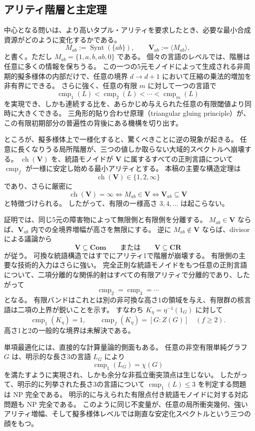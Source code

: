 \documentclass[10pt,a4paper]{ltjsarticle}
\theoremstyle{definition}
\theoremstyle{remark}
\newcommand{\cmp}{\operatorname{cmp}}
\begin{document}
\subsection{アリティ階層と主定理}

中心となる問いは、より高いタプル・アリティを要求したとき、必要な最小合成資源がどのように変化するかである。
\[
M_{ab}:=\operatorname{Synt}(\{ab\}),
\qquad
\mathbf V_{ab}:=\langle M_{ab}\rangle,
\]
と書く。ただし $M_{ab}=\{1,a,b,ab,0\}$ である。
個々の言語のレベルでは、階層は任意に多くの情報を保ちうる。
この一つの5元モノイドによって生成される非周期的擬多様体の内部だけで、任意の境界 $d\to d+1$ において圧縮の乗法的増加を非有界にできる。
さらに強く、任意の有限 $m$ に対して一つの言語で
\[
\cmp_1(L)<\cmp_2(L)<\cdots<\cmp_m(L)
\]
を実現でき、しかも連続する比を、あらかじめ与えられた任意の有限閾値より同時に大きくできる。
三角形的貼り合わせ原理（triangular gluing principle）が、この有限初期部分の普遍性の背後にある機構を切り出す。

ところが、擬多様体上で一様化すると、驚くべきことに逆の現象が起きる。
任意に長くなりうる局所階層が、三つの値しか取らない大域的スペクトルへ崩壊する。
$\operatorname{ch}(\mathbf V)$ を、統語モノイドが $\mathbf V$ に属するすべての正則言語について $\cmp_f$ が一様に安定し始める最小アリティとする。
本稿の主要な構造定理は
\[
 \boxed{\operatorname{ch}(\mathbf V)\in\{1,2,\infty\}}
\]
であり、さらに厳密に
\[
\operatorname{ch}(\mathbf V)=\infty
\Longleftrightarrow
M_{ab}\in\mathbf V
\Longleftrightarrow
\mathbf V_{ab}\subseteq\mathbf V
\]
と特徴づけられる。
したがって、有限の一様高さ $3,4,\ldots$ は起こらない。

証明では、同じ5元の障害物によって無限側と有限側を分離する。
$M_{ab}\in\mathbf V$ ならば、$\mathbf V_{ab}$ 内での全境界増幅が高さを無限にする。
逆に $M_{ab}\notin\mathbf V$ ならば、divisor による議論から
\[
\mathbf V\subseteq\mathbf{Com}
\qquad\text{または}\qquad
\mathbf V\subseteq\mathbf{CR}
\]
が従う。
可換な統語構造ではすでにアリティ1で階層が崩壊する。
有限側の主要な技術的入力はさらに強い。
完全正則な統語モノイドをもつ任意の正則言語について、二項分離的な関係的射はすべての有限アリティで分離的であり、したがって
\[
\cmp_2=\cmp_3=\cdots
\]
となる。
有限バンドはこれとは別の非可換な高さ1の領域を与え、有限群の核言語は二項の上界が鋭いことを示す。
すなわち $K_\eta=\eta^{-1}(1_G)$ に対して
\[
\cmp_1(K_\eta)=1,
\qquad
\cmp_f(K_\eta)=[G:Z(G)]\quad(f\ge2).
\]
高さ1と2の一般的な境界は未解決である。

単項最適化には、直接的な計算量論的側面もある。
任意の非空有限単純グラフ $G$ は、明示的な長さ3の言語 $L_G$ により
\[
\cmp_1(L_G)=\chi(G)
\]
を満たすように実現され、しかも余分な非孤立衝突頂点は生じない。
したがって、明示的に列挙された長さ3の言語について $\cmp_1(L)\le3$ を判定する問題は NP 完全である。
明示的に与えられた有限点付き統語モノイドに対する対応問題も NP 完全である。
このように同じ不変量が、任意の局所衝突幾何、強いアリティ増幅、そして擬多様体レベルでは剛直な安定化スペクトルという三つの顔をもつ。
\end{document}
